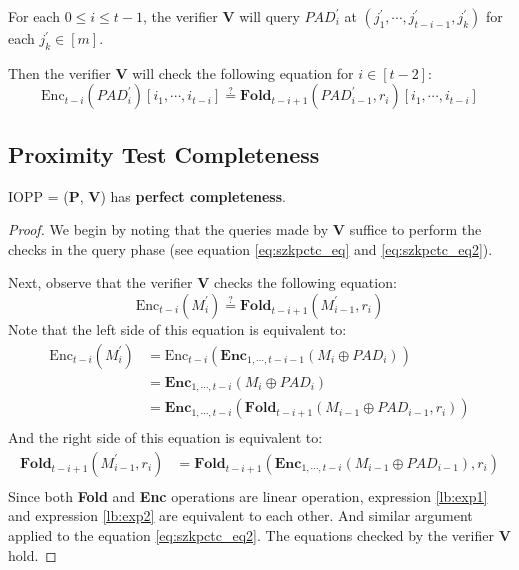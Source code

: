 \begin{enumerate}
    For each $0 \le i \le t-1$, 
    the verifier $\textbf{V}$ will query $PAD_{i}^{\prime}$ at $(j_1^\prime, \cdots, j_{t-i-1}^\prime, j_k^\prime)$ for each $j_k^\prime \in [m]$. 
    
    Then the verifier $\textbf{V}$ will check the following equation for $i \in [t-2]$:
\begin{equation}
\label{eq:szkpctc_eq2}
    \text{Enc}_{t-i}(PAD_i^\prime)[i_1, \cdots, i_{t-i}] \stackrel{?}{=} \textbf{Fold}_{t-i+1}(PAD_{i-1}^\prime, r_i) [i_1, \cdots, i_{t-i}]
\end{equation}




\end{enumerate}

\subsection{Proximity Test Completeness}

\begin{lemma}
\label{lemma:szkpctcc}

IOPP = ($\textbf{P}$, $\textbf{V}$) has \textbf{perfect completeness}.

\end{lemma}
\begin{proof}
We begin by noting that the queries made by $\textbf{V}$ suffice to perform the checks in the query phase (see equation \ref{eq:szkpctc_eq} and \ref{eq:szkpctc_eq2}).

Next, observe that the verifier $\textbf{V}$ checks the following equation:
$$
    \text{Enc}_{t-i}(M_i^\prime) \stackrel{?}{=} 
    \textbf{Fold}_{t-i+1}(M_{i-1}^\prime, r_i) 
$$
Note that the left side of this equation is equivalent to:
\begin{align}
\text{Enc}_{t-i}(M_i^\prime) \nonumber
&= \text{Enc}_{t-i}(\textbf{Enc}_{1, \cdots, t- i - 1}(M_i \oplus PAD_i)) \nonumber \\
&= \textbf{Enc}_{1, \cdots, t-i}(M_i \oplus PAD_i) \nonumber \\
&= \textbf{Enc}_{1, \cdots, t-i}(\textbf{Fold}_{t-i+1}(M_{i-1} \oplus PAD_{i-1}, r_i)) \label{lb:exp1} \\
\end{align}
And the right side of this equation is equivalent to:
\begin{align}
\textbf{Fold}_{t-i+1}(M_{i-1}^\prime, r_i) 
&= \textbf{Fold}_{t-i+1}(\textbf{Enc}_{1, \cdots, t- i}(M_{i-1} \oplus PAD_{i-1}), r_i) \label{lb:exp2} \\
\end{align}
Since both \textbf{Fold} and \textbf{Enc} operations are linear operation, expression \ref{lb:exp1} and  expression \ref{lb:exp2} are equivalent to each other. And similar argument applied to the equation \ref{eq:szkpctc_eq2}.
The equations checked by the verifier $\textbf{V}$ hold.

\end{proof}




